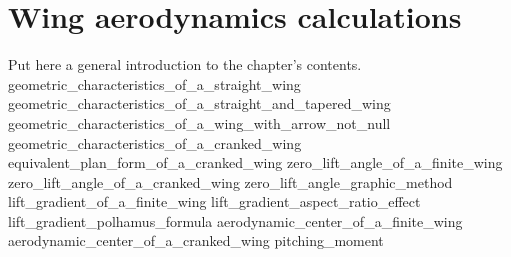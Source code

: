 \documentclass[[12pt,twoside]{book}
\begin{document}
%
%
\chapter%
   [Wing aerodynamics calculations]%
   {Wing aerodynamics calculations}
\label{chap:Wing}

\setcounter{minitocdepth}{2}%
\minitoc %

\vspace{\baselineskip}

\noindent
Put here a general introduction to the chapter's contents.
%
{geometric_characteristics_of_a_straight_wing}
{geometric_characteristics_of_a_straight_and_tapered_wing}
{geometric_characteristics_of_a_wing_with_arrow_not_null}
{geometric_characteristics_of_a_cranked_wing}
{equivalent_plan_form_of_a_cranked_wing}
{zero_lift_angle_of_a_finite_wing}
{zero_lift_angle_of_a_cranked_wing}
{zero_lift_angle_graphic_method}
{lift_gradient_of_a_finite_wing}
{lift_gradient_aspect_ratio_effect}
{lift_gradient_polhamus_formula}
{aerodynamic_center_of_a_finite_wing}
{aerodynamic_center_of_a_cranked_wing}
{pitching_moment}
\end{document}
